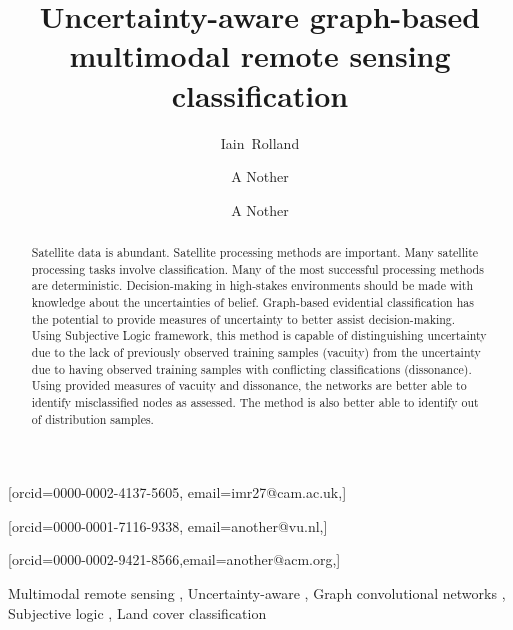 \documentclass[
twocolumn,
]{ceurart}
\begin{document}


\title{Uncertainty-aware graph-based multimodal remote sensing classification}

\author[1]{Iain~Rolland}[orcid=0000-0002-4137-5605, email=imr27@cam.ac.uk,]

\address[1]{Department of Engineering, University of Cambridge, Cambridge, CB2 1PZ United Kingdom}
\address[2]{Joint Institute for Nuclear Research, 6 Joliot-Curie, Dubna, Moscow region, 141980, Russian Federation}

\author[2]{A Nother}[orcid=0000-0001-7116-9338, email=another@vu.nl,]
\address[3]{Vrije Universiteit Amsterdam, De Boelelaan 1105, 1081 HV Amsterdam, The Netherlands}

\author[3]{A Nother}[orcid=0000-0002-9421-8566,email=another@acm.org,]

\begin{abstract}
Satellite data is abundant.
Satellite processing methods are important.
Many satellite processing tasks involve classification.
Many of the most successful processing methods are deterministic.
Decision-making in high-stakes environments should be made with knowledge about the uncertainties of belief.
Graph-based evidential classification has the potential to provide measures of uncertainty to better assist decision-making.
Using Subjective Logic framework, this method is capable of distinguishing uncertainty due to the lack of previously observed training samples (vacuity) from the uncertainty due to having observed training samples with conflicting classifications (dissonance).
Using provided measures of vacuity and dissonance, the networks are better able to identify misclassified nodes as assessed.
The method is also better able to identify out of distribution samples.
\end{abstract}

\begin{keywords}
  Multimodal remote sensing \sep
  Uncertainty-aware \sep
  Graph convolutional networks \sep
  Subjective logic \sep
  Land cover classification
\end{keywords}
\end{document}
